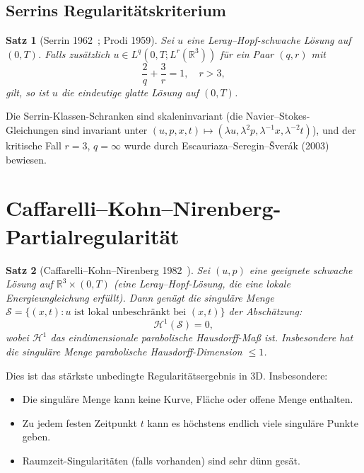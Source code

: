 \documentclass[12pt,a4paper]{article}
\newtheorem{theorem}{Satz}[section]
\theoremstyle{remark}
\begin{document}
\subsection{Serrins Regularitätskriterium}

\begin{theorem}[Serrin 1962~\cite{Serrin1962}; Prodi 1959]
  Sei $u$ eine Leray--Hopf-schwache Lösung auf $(0,T)$. Falls zusätzlich
  $u \in L^q(0,T; L^r(\mathbb{R}^3))$ für ein Paar $(q,r)$ mit
  \[
    \frac{2}{q} + \frac{3}{r} = 1, \quad r > 3,
  \]
  gilt, so ist $u$ die eindeutige glatte Lösung auf $(0,T)$.
\end{theorem}

Die Serrin-Klassen-Schranken sind skaleninvariant (die Navier--Stokes-Gleichungen sind
invariant unter $(u,p,x,t) \mapsto (\lambda u, \lambda^2 p, \lambda^{-1}x, \lambda^{-2}t)$),
und der kritische Fall $r=3$, $q=\infty$ wurde durch Escauriaza--Seregin--Šverák
(2003)~\cite{ESS2003} bewiesen.

\section{Caffarelli--Kohn--Nirenberg-Partialregularität}

\begin{theorem}[Caffarelli--Kohn--Nirenberg 1982~\cite{CKN1982}]
  Sei $(u, p)$ eine \emph{geeignete schwache Lösung} auf $\mathbb{R}^3 \times (0,T)$
  (eine Leray--Hopf-Lösung, die eine lokale Energieungleichung erfüllt). Dann genügt die
  singuläre Menge $\mathcal{S} = \{(x,t) : u \text{ ist lokal unbeschränkt bei } (x,t)\}$
  der Abschätzung:
  \[
    \mathcal{H}^1(\mathcal{S}) = 0,
  \]
  wobei $\mathcal{H}^1$ das eindimensionale parabolische Hausdorff-Maß ist.
  Insbesondere hat die singuläre Menge \emph{parabolische Hausdorff-Dimension} $\leq 1$.
\end{theorem}

Dies ist das stärkste unbedingte Regularitätsergebnis in 3D. Insbesondere:
\begin{itemize}[nosep]
  \item Die singuläre Menge kann keine Kurve, Fläche oder offene Menge enthalten.
  \item Zu jedem festen Zeitpunkt $t$ kann es höchstens endlich viele singuläre Punkte geben.
  \item Raumzeit-Singularitäten (falls vorhanden) sind sehr dünn gesät.
\end{itemize}
\end{document}
